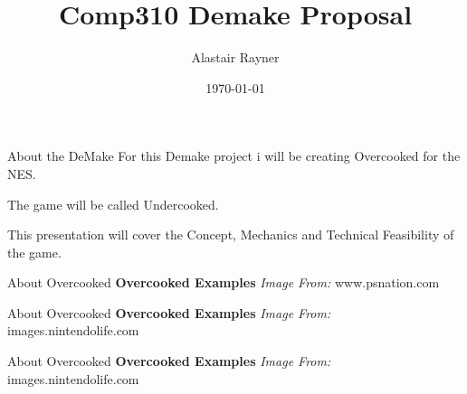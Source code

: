 \documentclass{beamer}
\title{Comp310 Demake Proposal}
\author{Alastair Rayner}
\date{\today}
\begin{document}
\maketitle


\begin{frame}{About the DeMake}
	  For this Demake project i will be creating Overcooked for the NES. \pause
	  
	  The game will be called Undercooked.\pause
	  
	 This presentation will cover the Concept, Mechanics and Technical Feasibility of the game. \pause
\end{frame}

\begin{frame}{About Overcooked}
    \textbf{Overcooked Examples}
    \textit{Image From:} www.psnation.com
\end{frame}

\begin{frame}{About Overcooked}
    \textbf{Overcooked Examples}
    \textit{Image From:} images.nintendolife.com
\end{frame}

\begin{frame}{About Overcooked}
    \textbf{Overcooked Examples}
   \textit{Image From:} images.nintendolife.com
\end{frame}
\end{document}
